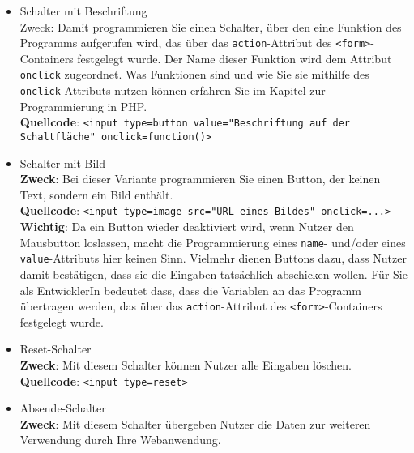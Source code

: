 \begin{itemize}
	\item Schalter mit Beschriftung\\
	
	Zweck: Damit programmieren Sie einen Schalter, über den eine Funktion des Programms aufgerufen wird, das über das \verb|action|-Attribut des \verb|<form>|-Containers festgelegt wurde. Der Name dieser Funktion wird dem Attribut \verb|onclick| zugeordnet. Was Funktionen sind und wie Sie sie mithilfe des \verb|onclick|-Attributs nutzen können erfahren Sie im Kapitel zur Programmierung in PHP.\\

	\textbf{Quellcode}: \verb|<input type=button value="Beschriftung auf der Schaltfläche" onclick=function()>|\\
		
	\item Schalter mit Bild\\
	
	\textbf{Zweck}: Bei dieser Variante programmieren Sie einen Button, der keinen Text, sondern ein Bild enthält.\\
	
	\textbf{Quellcode}: \verb|<input type=image src="URL eines Bildes" onclick=...>|\\
	
	\textbf{Wichtig}: Da ein Button wieder deaktiviert wird, wenn Nutzer den Mausbutton loslassen, macht die Programmierung eines \verb|name|- und/oder eines \verb|value|-Attributs hier keinen Sinn. Vielmehr dienen Buttons dazu, dass Nutzer damit bestätigen, dass sie die Eingaben tatsächlich abschicken wollen. Für Sie als EntwicklerIn bedeutet dass, dass die Variablen an das Programm übertragen werden, das über das \verb|action|-Attribut des \verb|<form>|-Containers festgelegt wurde.\\
	
	\item Reset-Schalter\\
	
	\textbf{Zweck}: Mit diesem Schalter können Nutzer alle Eingaben löschen.\\
	
	\textbf{Quellcode}: \verb|<input type=reset>|\\
	
	\item Absende-Schalter\\
	
	\textbf{Zweck}: Mit diesem Schalter übergeben Nutzer die Daten zur weiteren Verwendung durch Ihre Webanwendung.\\
	

\end{itemize}
